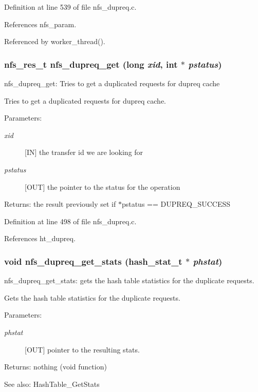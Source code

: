 Definition at line 539 of file nfs\_\-dupreq.c.

References nfs\_\-param.

Referenced by worker\_\-thread().
\subsubsection{\setlength{\rightskip}{0pt plus 5cm}nfs\_\-res\_\-t nfs\_\-dupreq\_\-get (long {\em xid}, int $\ast$ {\em pstatus})}\label{nfs__dupreq_8c_a16}


nfs\_\-dupreq\_\-get: Tries to get a duplicated requests for dupreq cache

Tries to get a duplicated requests for dupreq cache.

\begin{Desc}
\item[Parameters:]
\begin{description}
\item[{\em xid}][IN] the transfer id we are looking for \item[{\em pstatus}][OUT] the pointer to the status for the operation\end{description}
\end{Desc}
\begin{Desc}
\item[Returns:]the result previously set if $\ast$pstatus == DUPREQ\_\-SUCCESS \end{Desc}


Definition at line 498 of file nfs\_\-dupreq.c.

References ht\_\-dupreq.
\subsubsection{\setlength{\rightskip}{0pt plus 5cm}void nfs\_\-dupreq\_\-get\_\-stats (hash\_\-stat\_\-t $\ast$ {\em phstat})}\label{nfs__dupreq_8c_a18}


nfs\_\-dupreq\_\-get\_\-stats: gets the hash table statistics for the duplicate requests.

Gets the hash table statistics for the duplicate requests.

\begin{Desc}
\item[Parameters:]
\begin{description}
\item[{\em phstat}][OUT] pointer to the resulting stats.\end{description}
\end{Desc}
\begin{Desc}
\item[Returns:]nothing (void function)\end{Desc}
\begin{Desc}
\item[See also:]Hash\-Table\_\-Get\-Stats \end{Desc}


